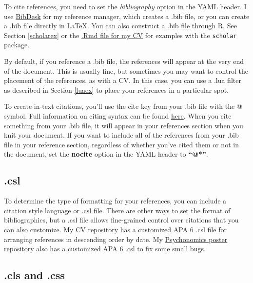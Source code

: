\documentclass[
  openany]{book}
\begin{document}
To cite references, you need to set the \emph{bibliography} option in the YAML header. I use \href{https://bibdesk.sourceforge.io/}{BibDesk} for my reference manager, which creates a .bib file, or you can create a .bib file directly in LaTeX. You can also construct a \href{https://rmarkdown.rstudio.com/authoring_bibliographies_and_citations.html}{.bib file} through R. See Section \ref{scholarex} or the \href{https://github.com/hollzzar/zaharchuk-cv/blob/master/Zaharchuk_CV.Rmd}{.Rmd file for my CV} for examples with the \texttt{scholar} package.

By default, if you reference a .bib file, the references will appear at the very end of the document. This is usually fine, but sometimes you may want to control the placement of the references, as with a CV. In this case, you can use a .lua filter as described in Section \ref{luaex} to place your references in a particular spot.

To create in-text citations, you'll use the cite key from your .bib file with the @ symbol. Full information on citing syntax can be found \href{https://rmarkdown.rstudio.com/authoring_bibliographies_and_citations.html\#citation_syntax}{here}. When you cite something from your .bib file, it will appear in your references section when you knit your document. If you want to include all of the references from your .bib file in your reference section, regardless of whether you've cited them or not in the document, set the \textbf{nocite} option in the YAML header to \textbf{``@*''}.

\hypertarget{csl}{%
\subsection{.csl}\label{csl}}

To determine the type of formatting for your references, you can include a citation style language or \href{https://github.com/citation-style-language/styles}{.csl file}. There are other ways to set the format of bibliographies, but a .csl file allows fine-grained control over citations that you can also customize. My \href{https://github.com/hollzzar/zaharchuk-cv}{CV} repository has a customized APA 6 .csl file for arranging references in descending order by date. My \href{https://github.com/hollzzar/psychonomics-poster}{Psychonomics poster} repository also has a customized APA 6 .csl to fix some small bugs.

\hypertarget{cls-and-.css}{%
\subsection{.cls and .css}\label{cls-and-.css}}
\end{document}
